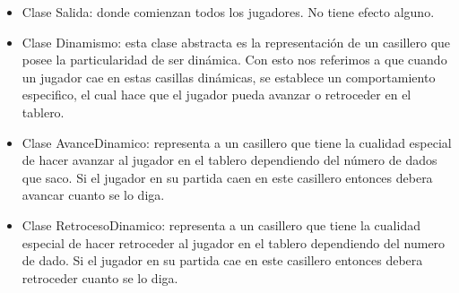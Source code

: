\documentclass[titlepage,a4paper]{article}
\begin{document}
\begin{itemize}
\item 
Clase Salida: donde comienzan todos los jugadores. No tiene efecto alguno.
\end{itemize}
\begin{itemize}
\item 
Clase Dinamismo: esta clase abstracta es  la representación de un casillero que posee la particularidad de ser dinámica. Con esto nos referimos a que cuando un jugador cae en estas casillas  dinámicas, se  establece un comportamiento especifico, el cual hace que el jugador pueda avanzar o retroceder en el tablero.
\end{itemize}
\begin{itemize}
\item 
Clase AvanceDinamico: representa a un casillero que tiene la cualidad  especial de hacer avanzar al jugador en el tablero  dependiendo del número de dados que saco. Si el jugador en su partida caen en este casillero entonces debera avancar cuanto se lo diga.
\end{itemize}
\begin{itemize}
\item 
Clase RetrocesoDinamico: representa a un casillero que tiene la cualidad especial de hacer retroceder al jugador en el tablero dependiendo del numero de dado. Si el jugador en su partida cae en este casillero entonces debera retroceder cuanto se lo diga.  
\end{itemize}
\end{document}
